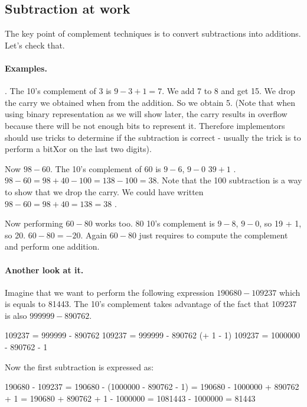 \documentclass[a4paper,10pt,twoside]{book}
\begin{document}
\subsection{Subtraction at work}
The key point of complement techniques is to convert subtractions into additions. Let's check that.

\paragraph{Examples.}
. The 10's complement of 3 is $9 - 3 + 1 = 7$. We add 7 to 8 and get 15. 
We drop the carry we obtained when from the addition. So we obtain 5. (Note that when using binary representation as we will show later, the carry results in overflow because there will be not enough bits to represent it. Therefore implementors should use tricks to determine if the subtraction is correct - usually the trick is to perform a bitXor on the last two digits).

Now $98-60$. The 10's complement of 60 is $9-6$, $9-0$ \ie $39 + 1$ . 
 $98-60 = 98 + 40 - 100 = 138 - 100 = 38$. Note that the 100 subtraction is a way to show that we drop the carry. 
 We could have written $98-60 = 98 + 40 = 138 = 38$ .


Now performing $60-80$ works too. 80 10's complement is $9-8$, $9-0$, so 19 + 1, so 20.
$60 - 80 = -20$. Again $60-80$ just requires to compute the complement and perform one addition.


\paragraph{Another look at it.} 
Imagine that we want to perform the following expression $190680 - 109237$ which is equals to 81443.
The 10's complement takes advantage of the fact that 109237 is also $999999 - 890762$.

\begin{code}{}
109237 = 999999 - 890762
109237 = 999999 - 890762 (+ 1 - 1)
109237 = 1000000 - 890762 - 1
\end{code}

Now the first subtraction is expressed as:
\begin{code}{}
190680 - 109237
= 190680 - (1000000 - 890762 - 1)
= 190680 - 1000000 + 890762 + 1
= 190680  + 890762 + 1 - 1000000
= 1081443 - 1000000
= 81443
\end{code}
\end{document}
